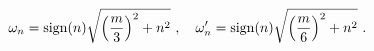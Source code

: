 \begin{equation}
\omega_n = {\rm sign}(n)
      \sqrt{ \left( \frac{m}{3} \right)^2 + n^2 }~,~~~
\omega'_n = {\rm sign}(n)
      \sqrt{ \left( \frac{m}{6} \right)^2 + n^2 }~.
\end{equation}

